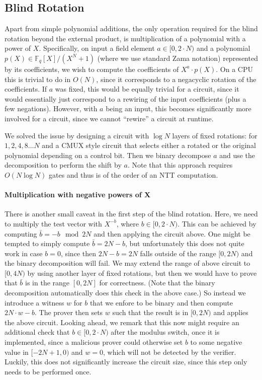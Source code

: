 \documentclass{zamarep}
\newcommand{\field}{\mathbb{F}}
\begin{document}
\subsection{Blind Rotation}
\label{sec:blind}
Apart from simple polynomial additions, the only operation required for the blind rotation beyond the external product, is multiplication of a polynomial with a power of $X$. Specifically, on input a field element $a \in [0, 2 \cdot N)$ and a polynomial $p(X) \in \field_q[X]/(X^N + 1) $ (where we use standard Zama notation) represented by its coefficients, we wish to compute the coefficients of $X^a \cdot p(X)$. On a CPU this is trivial to do in $O(N)$, since it corresponds to a negacyclic rotation of the coefficients. If $a$ was fixed, this would be equally trivial for a circuit, since it would essentially just correspond to a rewiring of the input coefficients (plus a few negations). However, with $a$ being an input, this becomes significantly more involved for a circuit, since we cannot ``rewire'' a circuit at runtime.

We solved the issue by designing a circuit with $\log N$ layers of fixed rotations: for $1, 2, 4, 8 \dots N$ and a CMUX style circuit that selects either a rotated or the original polynomial depending on a control bit. Then we binary decompose $a$ and use the decomposition to perform the shift by $a$. Note that this approach requires $O(N \log N)$ gates and thus is of the order of an NTT computation.

\paragraph{Multiplication with negative powers of X}
There is another small caveat in the first step of the blind rotation. Here, we need to multiply the test vector with $X^{-b} $, where $b \in [0, 2\cdot N)$. This can be achieved by computing $\bar b = -b \mod 2N$ and then applying the circuit above. One might be tempted to simply compute $\bar b = 2N - b$, but unfortunately this does not quite work in case $b = 0$, since then $2N - b = 2N$ falls outside of the range $[0, 2N)$ and the binary decomposition will fail. We may extend the range of above circuit to $[0, 4N)$ by using another layer of fixed rotations, but then we would have to prove that $\bar b$ is in the range $[0, 2N]$ for correctness. (Note that the binary decomposition automatically does this check in the above case.) So instead we introduce a witness $w$ for $b$ that we enfore to be binary and then compute $2N \cdot w - b$. The prover then sets $w$ such that the result is in $[0, 2N)$ and applies the above circuit. Looking ahead, we remark  that this now might require an additional check that $b \in [0, 2\cdot N)$ after the modulus switch, once it is implemented, since a malicious prover could otherwise set $b$ to some negative value in $[-2N + 1, 0)$ and $w = 0$, which will not be detected by the verifier. Luckily, this does not significantly increase the circuit size, since this step only needs to be performed once. 
\end{document}
